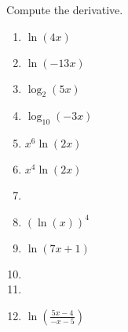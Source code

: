 Compute the derivative. 

\begin{multicols}{2}
\begin{enumerate}[ref={\fcProblemRef}]
\item $\displaystyle \ln(4x)$

\item $\displaystyle \ln(-13 x)$

\item  $\displaystyle\log_2(5 x)$

\item  $\displaystyle\log_{10}(-3 x)$

\item  $\displaystyle x^6\ln(2x)$

\item $\displaystyle x^{4} \ln\left(2 x\right)$

\item  
\item $\displaystyle (\ln{}\left({{x}}\right))^{4} $

\item $\displaystyle \ln{}\left(7 {{x}}+1\right)$

\item 
\item 
\item $\displaystyle \ln{}\left(\frac{5 {{x}}-4}{- {{x}}-5}\right) $

\end{enumerate}
\end{multicols}